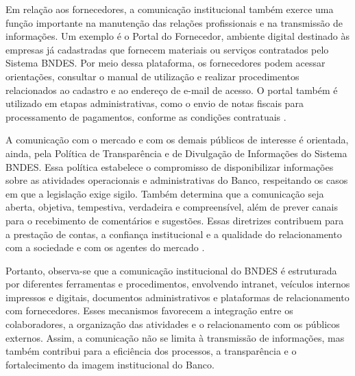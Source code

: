 Em relação aos fornecedores, a comunicação institucional também exerce uma função importante na manutenção das relações profissionais e na transmissão de informações. Um exemplo é o Portal do Fornecedor, ambiente digital destinado às empresas já cadastradas que fornecem materiais ou serviços contratados pelo Sistema BNDES. Por meio dessa plataforma, os fornecedores podem acessar orientações, consultar o manual de utilização e realizar procedimentos relacionados ao cadastro e ao endereço de e-mail de acesso. O portal também é utilizado em etapas administrativas, como o envio de notas fiscais para processamento de pagamentos, conforme as condições contratuais \cite{bndes2026fornecedor}.

A comunicação com o mercado e com os demais públicos de interesse é orientada, ainda, pela Política de Transparência e de Divulgação de Informações do Sistema BNDES. Essa política estabelece o compromisso de disponibilizar informações sobre as atividades operacionais e administrativas do Banco, respeitando os casos em que a legislação exige sigilo. Também determina que a comunicação seja aberta, objetiva, tempestiva, verdadeira e compreensível, além de prever canais para o recebimento de comentários e sugestões. Essas diretrizes contribuem para a prestação de contas, a confiança institucional e a qualidade do relacionamento com a sociedade e com os agentes do mercado \cite{bndes2025transparencia}.

Portanto, observa-se que a comunicação institucional do BNDES é estruturada por diferentes ferramentas e procedimentos, envolvendo intranet, veículos internos impressos e digitais, documentos administrativos e plataformas de relacionamento com fornecedores. Esses mecanismos favorecem a integração entre os colaboradores, a organização das atividades e o relacionamento com os públicos externos. Assim, a comunicação não se limita à transmissão de informações, mas também contribui para a eficiência dos processos, a transparência e o fortalecimento da imagem institucional do Banco.